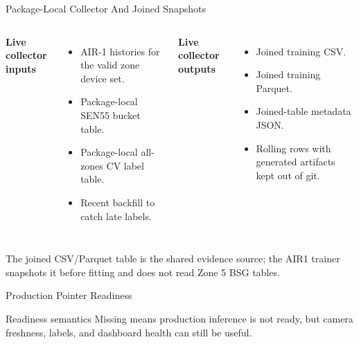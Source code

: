 \documentclass[aspectratio=169]{beamer}
\begin{document}
\begin{frame}[shrink=4]{Package-Local Collector And Joined Snapshots}
\begin{columns}[T,onlytextwidth]
\textbf{Live collector inputs}
\begin{itemize}
  \item AIR-1 histories for the valid zone device set.
  \item Package-local SEN55 bucket table.
  \item Package-local all-zones CV label table.
  \item Recent backfill to catch late labels.
\end{itemize}

\textbf{Live collector outputs}
\begin{itemize}
  \item Joined training CSV.
  \item Joined training Parquet.
  \item Joined-table metadata JSON.
  \item Rolling rows with generated artifacts kept out of git.
\end{itemize}
\end{columns}
\tightsep
\begin{center}
\parbox{0.84\textwidth}{\centering\small The joined CSV/Parquet table is the shared evidence source; the AIR1 trainer snapshots it before fitting and does not read Zone 5 BSG tables.}
\end{center}
\end{frame}

\begin{frame}[shrink=4]{Production Pointer Readiness}
\centering
{}
\tightsep
\begin{block}{Readiness semantics}
\small Missing  means production inference is not ready, but camera freshness, labels, and dashboard health can still be useful.
\end{block}
\end{frame}
\end{document}
